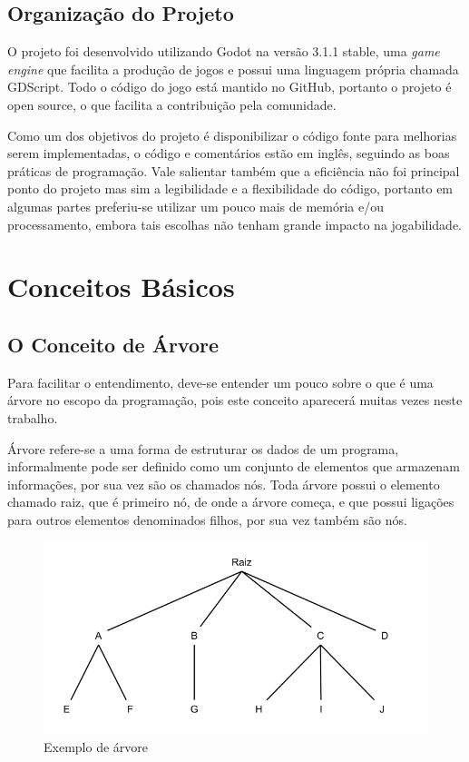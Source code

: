 \section{Organização do Projeto}
\label{sec:consideracoes_preliminares}

O projeto foi desenvolvido utilizando Godot na versão 3.1.1 stable, 
uma \textit{game engine} que facilita a produção de jogos e possui uma linguagem
própria chamada GDScript.
Todo o código do jogo está mantido no GitHub, portanto o projeto é open source,
o que facilita a contribuição pela comunidade.

Como um dos objetivos do projeto é disponibilizar o código fonte para
melhorias serem implementadas, o código e comentários estão em inglês, seguindo
as boas práticas de programação. Vale salientar também que a eficiência não foi
principal ponto do projeto mas sim a legibilidade e a flexibilidade do 
código, portanto em algumas partes preferiu-se utilizar um pouco mais de memória
e/ou processamento, embora tais escolhas não tenham grande impacto na 
jogabilidade.

\chapter{Conceitos Básicos}
\label{cap:Conceitos Básicos}

\section{O Conceito de Árvore}

Para facilitar o entendimento, deve-se entender um pouco sobre o que
é uma árvore no escopo da programação, pois este conceito aparecerá muitas
vezes neste trabalho.

Árvore refere-se a uma forma de estruturar os dados de um programa,
informalmente pode ser definido como um conjunto de elementos que armazenam 
informações, por sua vez são os chamados nós. Toda árvore possui o elemento 
chamado raiz, que é primeiro nó, de onde a árvore começa, e que possui ligações
para outros elementos denominados filhos, por sua vez também são nós.

\begin{figure}[h]
    \includegraphics[width=\linewidth]{../figuras/arvore.png}
    \caption{Exemplo de árvore}
\end{figure}   

